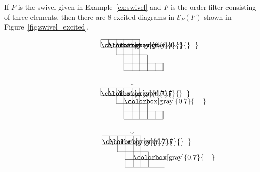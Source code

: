 \documentclass[ALCO,ThmDefs,Unicode,epreuves]{cedram}
\newcommand\EE{\mathcal{E}}
\begin{document}
\begin{exam}
\label{ex:swivel_excited}
If $P$ is the swivel given in Example~\ref{ex:swivel} and $F$ is the order filter consisting of three elements, 
then there are $8$ excited diagrams in $\EE_P(F)$ shown in Figure~\ref{fig:swivel_excited}.
\begin{figure}[!htb]
$$
\setlength{\unitlength}{1.1pt}
\begin{CD}
\raisebox{-20pt}{
\begin{picture}(80,40)
\fboxsep=0mm
\put(0,30){\colorbox[gray]{0.7}{\makebox(10,10){}}}
\put(10,30){\colorbox[gray]{0.7}{\makebox(10,10){}}}
\put(20,30){\colorbox[gray]{0.7}{\makebox(10,10){}}}
\put(0,40){\line(1,0){50}}
\put(0,30){\line(1,0){50}}
\put(20,20){\line(1,0){40}}
\put(30,10){\line(1,0){50}}
\put(30,0){\line(1,0){50}}
\put(0,30){\line(0,1){10}}
\put(10,30){\line(0,1){10}}
\put(20,20){\line(0,1){20}}
\put(30,0){\line(0,1){40}}
\put(40,0){\line(0,1){40}}
\put(50,0){\line(0,1){40}}
\put(60,0){\line(0,1){20}}
\put(70,0){\line(0,1){10}}
\put(80,0){\line(0,1){10}}
\end{picture}
}
\\
@VVV
\\
\raisebox{-20pt}{
\begin{picture}(80,40)
\fboxsep=0mm
\put(0,30){\colorbox[gray]{0.7}{\makebox(10,10){}}}
\put(10,30){\colorbox[gray]{0.7}{\makebox(10,10){}}}
\put(30,20){\colorbox[gray]{0.7}{\makebox(10,10){}}}
\put(0,40){\line(1,0){50}}
\put(0,30){\line(1,0){50}}
\put(20,20){\line(1,0){40}}
\put(30,10){\line(1,0){50}}
\put(30,0){\line(1,0){50}}
\put(0,30){\line(0,1){10}}
\put(10,30){\line(0,1){10}}
\put(20,20){\line(0,1){20}}
\put(30,0){\line(0,1){40}}
\put(40,0){\line(0,1){40}}
\put(50,0){\line(0,1){40}}
\put(60,0){\line(0,1){20}}
\put(70,0){\line(0,1){10}}
\put(80,0){\line(0,1){10}}
\put(20,30){\makebox(10,10){$\times$}}
\end{picture}
}
\\
@VVV
\\
\raisebox{-20pt}{
\begin{picture}(80,40)
\fboxsep=0mm
\put(0,30){\colorbox[gray]{0.7}{\makebox(10,10){}}}
\put(10,30){\colorbox[gray]{0.7}{\makebox(10,10){}}}
\put(40,10){\colorbox[gray]{0.7}{\makebox(10,10){}}}
\put(0,40){\line(1,0){50}}
\put(0,30){\line(1,0){50}}
\put(20,20){\line(1,0){40}}
\put(30,10){\line(1,0){50}}
\put(30,0){\line(1,0){50}}
\put(0,30){\line(0,1){10}}
\put(10,30){\line(0,1){10}}
\put(20,20){\line(0,1){20}}
\put(30,0){\line(0,1){40}}
\put(40,0){\line(0,1){40}}
\put(50,0){\line(0,1){40}}
\put(60,0){\line(0,1){20}}

\end{picture}}
\end{CD}$$
\end{figure}
\end{exam}
\end{document}
